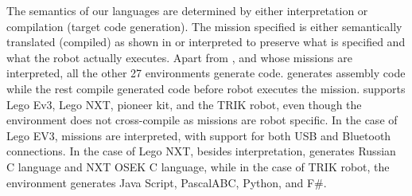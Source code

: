\parhead{\fsemantics} The semantics of our languages are determined by either interpretation or compilation (target code generation). The mission specified is either semantically translated (compiled) as shown in  or interpreted to preserve what is specified and what the robot actually executes. Apart from \lego, and \codelab whose missions are interpreted, all the other 27 environments generate code. \metabot generates assembly code while the rest compile generated code before robot executes the mission.  \trik supports Lego Ev3, Lego NXT, pioneer kit, and the TRIK robot, even though the environment does not cross-compile as missions are robot specific. In the case of Lego EV3, missions are interpreted, with support for both USB and Bluetooth connections.
In the case of Lego NXT, besides interpretation, \trik generates Russian C language and NXT OSEK C language, while in the case of TRIK robot, the environment generates Java Script, PascalABC, Python, and F\#.%






